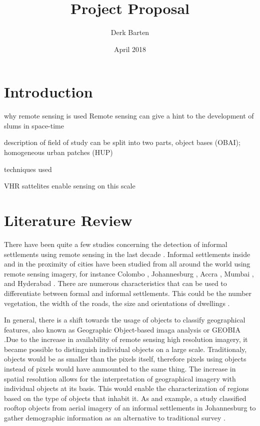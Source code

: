 \documentclass{article}
\title{Project Proposal}
\author{Derk Barten}
\date{April 2018}
\begin{document}
\maketitle

\section{Introduction}


why remote sensing is used
  Remote sensing can give a hint to the development of slums in space-time

description of field of study
can be split into two parts, object bases (OBAI); homogeneous urban patches (HUP)

techniques used

VHR sattelites enable sensing on this scale

\section{Literature Review}

There have been quite a few studies concerning the detection of informal
settlements using remote sensing in the last decade \cite{kuffer2016slums}.
Informal settlements inside and in the proximity of cities have been studied
from all around the world using remote sensing imagery, for instance Colombo
\cite{colombo}, Johannesburg \cite{williams2016automatic}, Accra \cite{accra},
Mumbai \cite{mumbai}, and Hyderabad \cite{hyderabad}. There are numerous
characteristics that can be used to differentiate between formal and informal
settlements. This could be the number vegetation, the width of the roads, the
size and orientations of dwellings \cite{owen2013approach}.

In general, there is a shift towards the usage of objects to classify geographical
features, also known as Geographic Object-based imaga analysis or GEOBIA
\cite{hay2008geographic}.Due to the increase in availability of remote sensing
high resolution imagery, it became possible to distinguish individual objects
on a large scale.  Traditionaly, objects would be as smaller than the pixels
itself, therefore pixels using objects instead of pixels would have ammounted
to the same thing.  The increase in spatial resolution allows for the
interpretation of geographical imagery with individual objects at its basis.
This would enable the characterization of regions based on the type of objects
that inhabit it.  As and example, a study classified rooftop objects from
aerial imagery of an informal settlements in Johannesburg to gather demographic
information as an alternative to traditional survey
\cite{williams2016automatic}.
\end{document}
